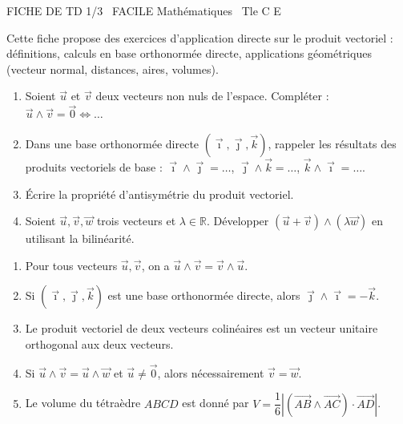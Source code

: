 \documentclass[11pt]{article}
\begin{document}
\begin{tcolorbox}[enhanced,colback=popink,colframe=popink,arc=10pt,boxrule=0pt,left=12pt,right=12pt,top=9pt,bottom=9pt]
{\color{white}\popxbold\small FICHE DE TD 1/3 \textbullet\ FACILE \hfill Mathématiques \textbullet\ Tle C E\par}
\end{tcolorbox}
\vspace{4pt}
Cette fiche propose des exercices d'application directe sur le produit vectoriel : définitions, calculs en base orthonormée directe, applications géométriques (vecteur normal, distances, aires, volumes).

\begin{exercice}
\begin{enumerate}
    \item Soient $\vec{u}$ et $\vec{v}$ deux vecteurs non nuls de l'espace. Compléter : $\vec{u} \wedge \vec{v} = \vec{0} \iff \dots$
    \item Dans une base orthonormée directe $(\vec{\imath}, \vec{\jmath}, \vec{k})$, rappeler les résultats des produits vectoriels de base : $\vec{\imath} \wedge \vec{\jmath} = \dots$, $\vec{\jmath} \wedge \vec{k} = \dots$, $\vec{k} \wedge \vec{\imath} = \dots$.
    \item Écrire la propriété d'antisymétrie du produit vectoriel.
    \item Soient $\vec{u}, \vec{v}, \vec{w}$ trois vecteurs et $\lambda \in \mathbb{R}$. Développer $(\vec{u} + \vec{v}) \wedge (\lambda \vec{w})$ en utilisant la bilinéarité.
\end{enumerate}
\end{exercice}

\begin{exercice}
\begin{enumerate}
    \item Pour tous vecteurs $\vec{u}, \vec{v}$, on a $\vec{u} \wedge \vec{v} = \vec{v} \wedge \vec{u}$.
    \item Si $(\vec{\imath}, \vec{\jmath}, \vec{k})$ est une base orthonormée directe, alors $\vec{\jmath} \wedge \vec{\imath} = -\vec{k}$.
    \item Le produit vectoriel de deux vecteurs colinéaires est un vecteur unitaire orthogonal aux deux vecteurs.
    \item Si $\vec{u} \wedge \vec{v} = \vec{u} \wedge \vec{w}$ et $\vec{u} \neq \vec{0}$, alors nécessairement $\vec{v} = \vec{w}$.
    \item Le volume du tétraèdre $ABCD$ est donné par $V = \dfrac{1}{6} \left| \left( \vec{AB} \wedge \vec{AC} \right) \cdot \vec{AD} \right|$.
\end{enumerate}
\end{exercice}
\end{document}
